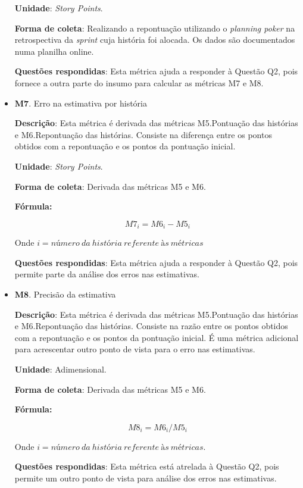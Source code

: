 \begin{itemize}
	   \subitem \textbf{Unidade}: \textit{Story Points}.

	   \subitem \textbf{Forma de coleta}: Realizando a repontuação utilizando o \textit{planning poker} na retrospectiva da \textit{sprint}
		    cuja história foi alocada. Os dados são documentados numa planilha online.

	   \subitem \textbf{Questões respondidas}: Esta métrica ajuda a responder à Questão Q2, pois fornece a outra parte do insumo para calcular
		    as métricas M7 e M8.

	 \item \textbf{M7}. Erro na estimativa por história

	   \subitem \textbf{Descrição}: Esta métrica é derivada das métricas M5.Pontuação das histórias e M6.Repontuação das histórias.
		    Consiste na diferença entre os pontos obtidos com a repontuação e os pontos da pontuação inicial.

	   \subitem \textbf{Unidade}: \textit{Story Points}.

	   \subitem \textbf{Forma de coleta}: Derivada das métricas M5 e M6.

	      \subsubitem \textbf{Fórmula:}

		$$ M7_i = M6_i - M5_i $$

	      \subsubitem Onde $i = número\ da\ história\ referente\ às\ métricas$

	   \subitem \textbf{Questões respondidas}: Esta métrica ajuda a responder à Questão Q2, pois permite parte da análise
		    dos erros nas estimativas.

	 \item \textbf{M8}. Precisão da estimativa

	   \subitem \textbf{Descrição}: Esta métrica é derivada das métricas M5.Pontuação das histórias e M6.Repontuação das histórias.
		    Consiste na razão entre os pontos obtidos com a repontuação e os pontos da pontuação inicial. É uma métrica adicional
		    para acrescentar outro ponto de vista para o erro nas estimativas.

	   \subitem \textbf{Unidade}: Adimensional.

	   \subitem \textbf{Forma de coleta}: Derivada das métricas M5 e M6.

	      \subsubitem \textbf{Fórmula:}

		$$ M8_i = M6_i / M5_i $$

	      \subsubitem Onde $i = número\ da\ história\ referente\ às\ métricas$.

	   \subitem \textbf{Questões respondidas}: Esta métrica está atrelada à Questão Q2, pois permite um outro ponto de vista
		    para análise dos erros nas estimativas.


\end{itemize}
